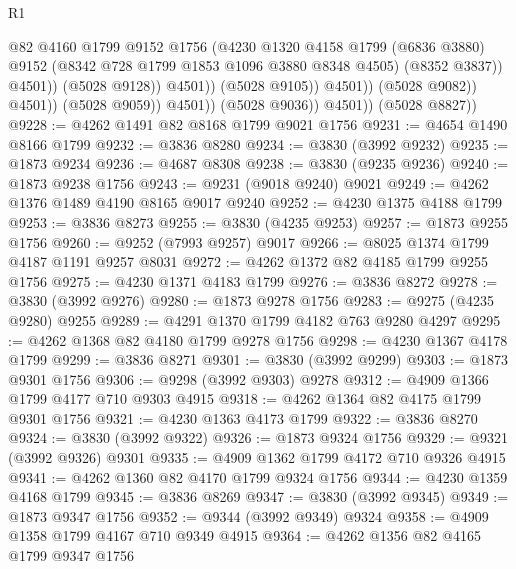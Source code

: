 \begin{lexlean}{R1}
\begin{coremodule}
                                        @82
                                        @4160
                                        @1799
                                        @9152
                                        @1756
                                        (@4230
                                          @1320
                                          @4158
                                          @1799
                                          (@6836 @3880)
                                          @9152
                                          (@8342 @728 @1799 @1853 @1096 @3880 @8348 @4505)
                                          (@8352 @3837))
                                        @4501))
                                    (@5028 @9128))
                                  @4501))
                              (@5028 @9105))
                            @4501))
                        (@5028 @9082))
                      @4501))
                  (@5028 @9059))
                @4501))
            (@5028 @9036))
          @4501))
      (@5028 @8827))
@9228 := @4262 @1491 @82 @8168 @1799 @9021 @1756
@9231 := @4654 @1490 @8166 @1799
@9232 := @3836 @8280
@9234 := @3830 (@3992 @9232)
@9235 := @1873 @9234
@9236 := @4687 @8308
@9238 := @3830 (@9235 @9236)
@9240 := @1873 @9238 @1756
@9243 := @9231 (@9018 @9240) @9021
@9249 := @4262 @1376 @1489 @4190 @8165 @9017 @9240
@9252 := @4230 @1375 @4188 @1799
@9253 := @3836 @8273
@9255 := @3830 (@4235 @9253)
@9257 := @1873 @9255 @1756
@9260 := @9252 (@7993 @9257) @9017
@9266 := @8025 @1374 @1799 @4187 @1191 @9257 @8031
@9272 := @4262 @1372 @82 @4185 @1799 @9255 @1756
@9275 := @4230 @1371 @4183 @1799
@9276 := @3836 @8272
@9278 := @3830 (@3992 @9276)
@9280 := @1873 @9278 @1756
@9283 := @9275 (@4235 @9280) @9255
@9289 := @4291 @1370 @1799 @4182 @763 @9280 @4297
@9295 := @4262 @1368 @82 @4180 @1799 @9278 @1756
@9298 := @4230 @1367 @4178 @1799
@9299 := @3836 @8271
@9301 := @3830 (@3992 @9299)
@9303 := @1873 @9301 @1756
@9306 := @9298 (@3992 @9303) @9278
@9312 := @4909 @1366 @1799 @4177 @710 @9303 @4915
@9318 := @4262 @1364 @82 @4175 @1799 @9301 @1756
@9321 := @4230 @1363 @4173 @1799
@9322 := @3836 @8270
@9324 := @3830 (@3992 @9322)
@9326 := @1873 @9324 @1756
@9329 := @9321 (@3992 @9326) @9301
@9335 := @4909 @1362 @1799 @4172 @710 @9326 @4915
@9341 := @4262 @1360 @82 @4170 @1799 @9324 @1756
@9344 := @4230 @1359 @4168 @1799
@9345 := @3836 @8269
@9347 := @3830 (@3992 @9345)
@9349 := @1873 @9347 @1756
@9352 := @9344 (@3992 @9349) @9324
@9358 := @4909 @1358 @1799 @4167 @710 @9349 @4915
@9364 := @4262 @1356 @82 @4165 @1799 @9347 @1756

\end{coremodule}
\end{lexlean}
